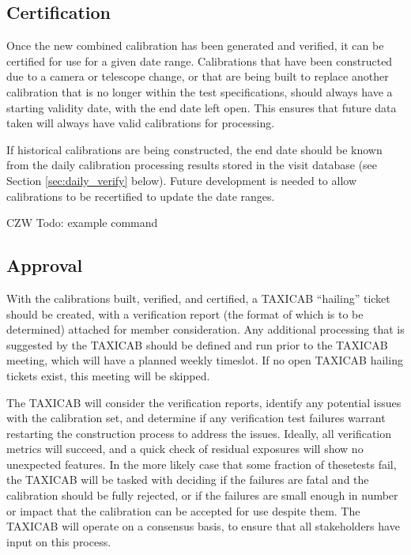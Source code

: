 \documentclass[DM,authoryear,toc]{lsstdoc}
\begin{document}
\subsection{Certification}

Once the new combined calibration has been generated and verified, it can be certified for use for a given date range.  Calibrations that have been constructed due to a camera or telescope change, or that are being built to replace another calibration that is no longer within the test specifications, should always have a starting validity date, with the end date left open.  This ensures that future data taken will always have valid calibrations for processing.

If historical calibrations are being constructed, the end date should be known from the daily calibration processing results stored in the visit database (see Section \ref{sec:daily_verify} below).  Future development is needed to allow calibrations to be recertified to update the date ranges.

CZW Todo: example command

\subsection{Approval}

With the calibrations built, verified, and certified, a TAXICAB ``hailing'' ticket should be created, with a verification report (the format of which is to be determined) attached for member consideration.  Any additional processing that is suggested by the TAXICAB should be defined and run prior to the TAXICAB meeting, which will have a planned weekly timeslot.  If no open TAXICAB hailing tickets exist, this meeting will be skipped.

The TAXICAB will consider the verification reports, identify any potential issues with the calibration set, and determine if any verification test failures warrant restarting the construction process to address the issues.  Ideally, all verification metrics will succeed, and a quick check of residual exposures will show no unexpected features.  In the more likely case that some fraction of thesetests fail, the TAXICAB will be tasked with deciding if the failures are fatal and the calibration should be fully rejected, or if the failures are small enough in number or impact that the calibration can be accepted for use despite them.  The TAXICAB will operate on a consensus basis, to ensure that all stakeholders have input on this process.
\end{document}

